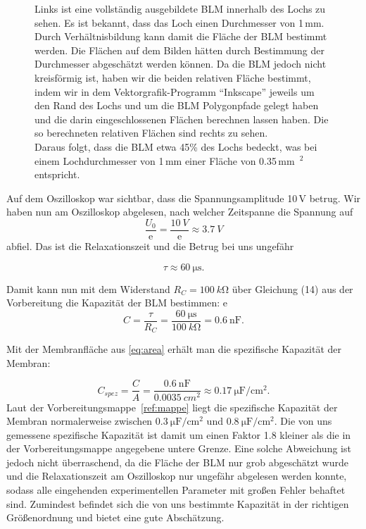 \documentclass[a4paper,ngerman]{scrartcl}
\begin{document}
\begin{figure}[tbh!]
\begin{minipage}[b]{.4\textwidth}
  \end{minipage}
  \caption{Links ist eine vollständig ausgebildete BLM innerhalb des Lochs zu sehen.
Es ist bekannt, dass das Loch einen Durchmesser von 1\,mm. Durch Verhältnisbildung kann damit die Fläche 
der BLM bestimmt werden. Die Flächen auf dem Bilden hätten durch Bestimmung der Durchmesser abgeschätzt werden können. Da die BLM jedoch
nicht kreisförmig ist, haben wir die beiden relativen Fläche bestimmt, indem wir in dem Vektorgrafik-Programm "`Inkscape"'
jeweils um den Rand des Lochs und um die BLM Polygonpfade gelegt haben und die darin eingeschlossenen Flächen berechnen lassen haben. Die so 
berechneten relativen Flächen sind rechts zu sehen.\\
Daraus folgt, dass die BLM etwa 45\% des Lochs bedeckt, was bei einem Lochdurchmesser von 1\,mm einer Fläche von 0.35\,mm~$^2$ entspricht.}
\label{fig:blmflaeche}
\end{figure}

Auf dem Oszilloskop war sichtbar, dass die Spannungsamplitude 10\,V betrug. Wir haben nun am Oszilloskop abgelesen, nach welcher Zeitspanne die Spannung auf
\begin{equation}
 \frac{U_0}{\mathrm{e}} = \frac{\SI{10}{V}}{\mathrm{e}} \approx \SI{3,7}{V} 
\end{equation}
abfiel. Das ist die Relaxationszeit und die Betrug bei uns ungefähr

\begin{equation}
  \tau \approx \SI{60}{\micro\s}.
\end{equation}

Damit kann nun  mit dem Widerstand $R_C = \SI{100}{k\ohm}$
über Gleichung (14) aus der Vorbereitung die Kapazität der BLM bestimmen:
e\begin{equation}
 C = \frac{\tau}{R_C} = \frac{\SI{60}{\micro\s}}{\SI{100}{k\ohm}} = \SI{0,6}{\nano\farad}.
\end{equation}

Mit der Membranfläche aus \eqref{eq:area} erhält man die spezifische Kapazität der Membran:

\begin{equation}
  C_{spez} = \frac{C}{A} = \frac{\SI{0,6}{\nano\farad}}{\SI{0,0035}{cm^2}} \approx \SI{0,17}{\micro\farad\per\cm^2}.
\end{equation}
Laut der Vorbereitungsmappe~\ref{ref:mappe} liegt die spezifische Kapazität der Membran normalerweise zwischen $\SI{0,3}{\micro\F\per\cm^2}$
und $\SI{0,8}{\micro\F\per\cm^2}$. Die von uns gemessene spezifische Kapazität ist damit um einen Faktor 1.8 kleiner als die 
in der Vorbereitungsmappe angegebene untere Grenze. Eine solche Abweichung ist jedoch nicht überraschend, da 
die Fläche der BLM nur grob abgeschätzt wurde und die Relaxationszeit 
am Oszilloskop nur ungefähr abgelesen werden konnte, sodass alle eingehenden experimentellen Parameter mit großen Fehler behaftet sind.
Zumindest befindet sich die von uns bestimmte Kapazität in der richtigen Größenordnung und bietet eine gute Abschätzung. \\
\end{document}
